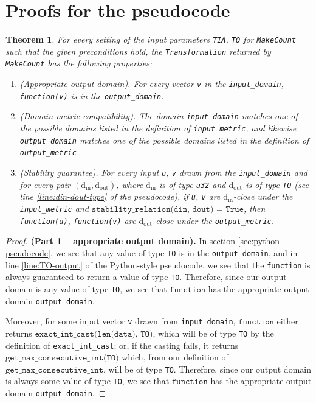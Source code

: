 \documentclass[12pt,letterpaper]{article}
\newcommand{\din}{\mathrm{d_{in}}}
\newcommand{\dout}{\mathrm{d_{out}}}
\newcommand{\function}{\texttt{function}}
\newtheorem{theorem}{Theorem}[section]
\theoremstyle{definition}
\begin{document}
\section{Proofs for the pseudocode}

\begin{theorem}
\label{thrm:domain-and-stability}
    For every setting of the input parameters \texttt{TIA}, \texttt{TO} for \texttt{MakeCount} such that the given preconditions hold, the \texttt{Transformation} returned by \texttt{MakeCount} has the following properties:
    \begin{enumerate}
        \item \textup{(Appropriate output domain).} For every vector \texttt{v} in the \texttt{input\_domain}, \texttt{function(v)} is in the \texttt{output\_domain}.
        
        \item \textup{(Domain-metric compatibility).} The domain \texttt{input\_domain} matches one of the possible domains listed in the definition of \texttt{input\_metric}, and likewise \texttt{output\_domain} matches one of the possible domains listed in the definition of \texttt{output\_metric}.
        
        \item \textup{(Stability guarantee).} For every input \texttt{u}, \texttt{v} drawn from the \texttt{input\_domain} and for every pair $(\din, \dout)$, where $\din$ is of type \texttt{u32} and $\dout$ is of type \texttt{TO} (see line \ref{line:din-dout-type} of the pseudocode), if \texttt{u}, \texttt{v} are $\din$-close under the \texttt{input\_metric} and $\texttt{stability\_relation(din, dout) = True}$, then \texttt{function(u)}, \texttt{function(v)} are $\dout$-close under the \texttt{output\_metric}.
    \end{enumerate}
\end{theorem}

\begin{proof} \textbf{(Part 1 -- appropriate output domain).}
In section \ref{sec:python-pseudocode}, we see that any value of type \texttt{TO} is in the \texttt{output\_domain}, and in line \ref{line:TO-output} of the Python-style pseudocode, we see that the \texttt{function} is always guaranteed to return a value of type \texttt{TO}. Therefore, since our output domain is any value of type \texttt{TO}, we see that $\function$ has the appropriate output domain \texttt{output\_domain}.

Moreover, for some input vector \texttt{v} drawn from \texttt{input\_domain}, $\function$ either returns $\texttt{exact\_int\_cast(len(data), TO)}$, which will be of type \texttt{TO} by the definition of \texttt{exact\_int\_cast}; or, if the casting fails, it returns $\texttt{get\_max\_consecutive\_int(TO)}$ which, from our definition of $\texttt{get\_max\_consecutive\_int}$, will be of type \texttt{TO}. Therefore, since our output domain is always some value of type \texttt{TO}, we see that $\function$ has the appropriate output domain \texttt{output\_domain}.
\end{proof}
\end{document}
